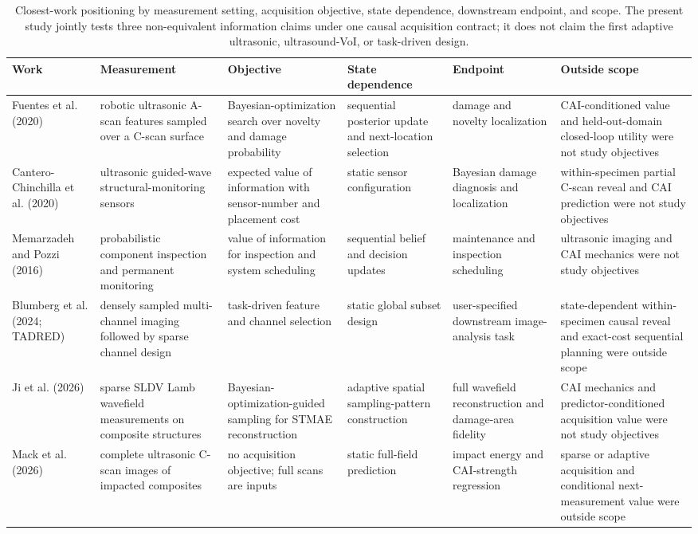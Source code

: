 \begin{table}[!tp]
\centering
\caption{Closest-work positioning by measurement setting, acquisition objective, state dependence, downstream endpoint, and scope. The present study jointly tests three non-equivalent information claims under one causal acquisition contract; it does not claim the first adaptive ultrasonic, ultrasound-VoI, or task-driven design.}
\label{tab:closest-work}
\scriptsize
\setlength{\tabcolsep}{2.8pt}
\begin{tabularx}{\textwidth}{@{}>{\RaggedRight\arraybackslash}p{}>{\RaggedRight\arraybackslash}p{}>{\RaggedRight\arraybackslash}p{}>{\RaggedRight\arraybackslash}p{}>{\RaggedRight\arraybackslash}p{}Y@{}}
\toprule
Work & Measurement & Objective & State dependence & Endpoint & Outside scope \\
\midrule
Fuentes et al. (2020) \cite{fuentes2020autonomous} & robotic ultrasonic A-scan features sampled over a C-scan surface & Bayesian-optimization search over novelty and damage probability & sequential posterior update and next-location selection & damage and novelty localization & CAI-conditioned value and held-out-domain closed-loop utility were not study objectives \\
Cantero-Chinchilla et al. (2020) \cite{cantero2020optimal} & ultrasonic guided-wave structural-monitoring sensors & expected value of information with sensor-number and placement cost & static sensor configuration & Bayesian damage diagnosis and localization & within-specimen partial C-scan reveal and CAI prediction were not study objectives \\
Memarzadeh and Pozzi (2016) \cite{memarzadeh2016value} & probabilistic component inspection and permanent monitoring & value of information for inspection and system scheduling & sequential belief and decision updates & maintenance and inspection scheduling & ultrasonic imaging and CAI mechanics were not study objectives \\
Blumberg et al. (2024; TADRED) \cite{blumberg2024experimental} & densely sampled multi-channel imaging followed by sparse channel design & task-driven feature and channel selection & static global subset design & user-specified downstream image-analysis task & state-dependent within-specimen causal reveal and exact-cost sequential planning were outside scope \\
Ji et al. (2026) \cite{ji2026adaptive} & sparse SLDV Lamb wavefield measurements on composite structures & Bayesian-optimization-guided sampling for STMAE reconstruction & adaptive spatial sampling-pattern construction & full wavefield reconstruction and damage-area fidelity & CAI mechanics and predictor-conditioned acquisition value were not study objectives \\
Mack et al. (2026) \cite{mack2026cscan} & complete ultrasonic C-scan images of impacted composites & no acquisition objective; full scans are inputs & static full-field prediction & impact energy and CAI-strength regression & sparse or adaptive acquisition and conditional next-measurement value were outside scope \\
\bottomrule
\end{tabularx}
\end{table}
